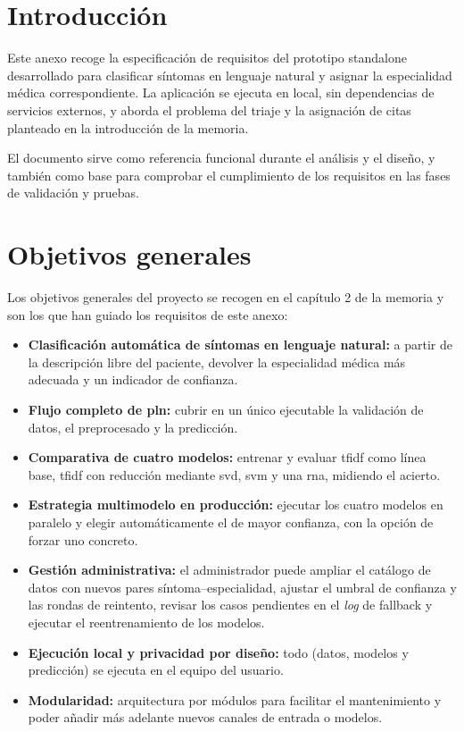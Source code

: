 
\section{Introducción}

Este anexo recoge la especificación de requisitos del prototipo \gls{standalone} desarrollado para clasificar síntomas en lenguaje natural y asignar la especialidad médica correspondiente. La aplicación se ejecuta en local, sin dependencias de servicios externos, y aborda el problema del triaje y la asignación de citas planteado en la introducción de la memoria.

El documento sirve como referencia funcional durante el análisis y el diseño, y también como base para comprobar el cumplimiento de los requisitos en las fases de validación y pruebas.

\section{Objetivos generales}

Los objetivos generales del proyecto se recogen en el capítulo 2 de la memoria y son los que han guiado los requisitos de este anexo:

\begin{itemize}
	\item \textbf{Clasificación automática de síntomas en lenguaje natural:} a partir de la descripción libre del paciente, devolver la especialidad médica más adecuada y un indicador de confianza.
	\item \textbf{Flujo completo de \gls{pln}:} cubrir en un único ejecutable la validación de datos, el preprocesado y la predicción.
	\item \textbf{Comparativa de cuatro modelos:} entrenar y evaluar \gls{tfidf} como línea base, \gls{tfidf} con reducción mediante \gls{svd}, \gls{svm} y una \gls{rna}, midiendo el acierto.
	\item \textbf{Estrategia multimodelo en producción:} ejecutar los cuatro modelos en paralelo y elegir automáticamente el de mayor confianza, con la opción de forzar uno concreto.
	\item \textbf{Gestión administrativa:} el administrador puede ampliar el catálogo de datos con nuevos pares síntoma--especialidad, ajustar el umbral de confianza y las rondas de reintento, revisar los casos pendientes en el \textit{log} de \gls{fallback} y ejecutar el reentrenamiento de los modelos.
	\item \textbf{Ejecución local y privacidad por diseño:} todo (datos, modelos y predicción) se ejecuta en el equipo del usuario. 
	\item \textbf{Modularidad:} arquitectura por módulos para facilitar el mantenimiento y poder añadir más adelante nuevos canales de entrada o modelos.
\end{itemize}

